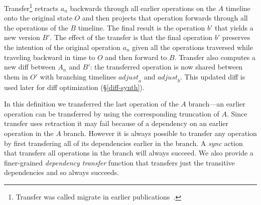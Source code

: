 \documentclass[english,submission]{programming}
\theoremstyle{definition}
\newcommand{\mathbox}[1]{\colorbox{black!10}{$#1$\phantom{i\hspace{-3.5pt}}}}
\begin{document}
Transfer\footnote{Transfer was called migrate in earlier publications~\cite{edwards21, edwards22}.} retracts \mathbox{a_n} backwards through all earlier operations on the \mathbox{A} timeline onto the original state \mathbox{O} and then projects that operation forwards through all the operations of the \mathbox{B} timeline. The final result is the operation \mathbox{b'} that yields a new version \mathbox{B'}. The effect of the transfer is that the final operation \mathbox{b'} preserves the intention of the original operation \mathbox{a_n} given all the operations traversed while traveling backward in time to \mathbox{O} and then forward to \mathbox{B}. Transfer also computes a new diff between \mathbox{A_n} and \mathbox{B'}: the transferred operation is now shared between them in \mathbox{O'} with branching timelines \mathbox{\mathit{adjust}_a} and \mathbox{\mathit{adjust}_b}. This updated diff is used later for diff optimization (\S\ref{diff-synth}).

In this definition we transferred the last operation of the \mathbox{A} branch---an earlier operation can be transferred by using the corresponding truncation of \mathbox{A}.
Since transfer uses retraction it may fail because of a dependency on an earlier operation in the \mathbox{A} branch. However it is always possible to transfer any operation by first transfering all of its dependencies earlier in the branch. A \textit{sync} action that transfers all operations in the branch will always succeed. We also provide a finer-grained \textit{dependency transfer} function that transfers just the transitive dependencies and so always succeeds.
\end{document}
